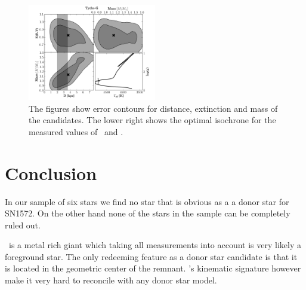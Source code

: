 \begin{figure}[htbp]
   \includegraphics[width=0.5\textwidth]{chapter3/plots/tycho-g-panel.pdf} 
   \caption{The figures show error contours for distance, extinction and mass of the candidates. The lower right shows the optimal isochrone \citep{2004ApJ...612..168P}  for the measured values of \teff\ and \logg. }
   \label{fig:mc_isochrone}
\end{figure}



%
%
%
%


\section{Conclusion}
\label{sec:conclusion_sn1572_hires}

In our sample of six stars we find no star that is obvious as a a donor star for SN1572. On the other hand none of the stars in the sample can be completely ruled out. 

\stara\ is a metal rich giant which taking all measurements into account is very likely a foreground star. The only redeeming feature as a donor star candidate is that it is located in the geometric center of the remnant. \stara's kinematic signature however make it very hard to reconcile with any donor star model.

